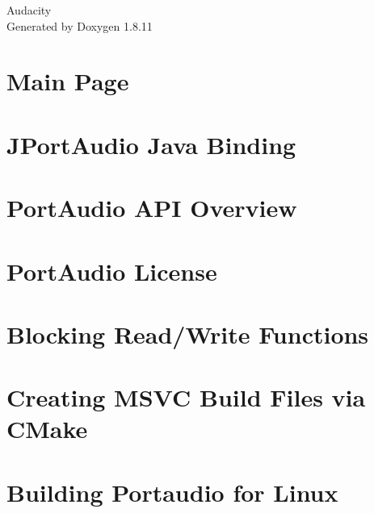 \documentclass[twoside]{book}
\newcommand{\+}{\discretionary{\mbox{\scriptsize$\hookleftarrow$}}{}{}}
\newcommand{\clearemptydoublepage}{%
  \newpage{\pagestyle{empty}\cleardoublepage}%
}
\begin{document}
\hypersetup{pageanchor=false,
             bookmarksnumbered=true,
             pdfencoding=unicode
            }
\begin{titlepage}
\vspace*{7cm}
\begin{center}%
{\Large Audacity }\\
\vspace*{1cm}
{\large Generated by Doxygen 1.8.11}\\
\end{center}
\end{titlepage}
\clearemptydoublepage
\tableofcontents
\clearemptydoublepage
{}
\hypersetup{pageanchor=true}

\chapter{Main Page}
\label{index}\hypertarget{index}{}
\chapter{J\+Port\+Audio Java Binding}
\label{java_binding}
\hypertarget{java_binding}{}

\chapter{Port\+Audio A\+PI Overview}
\label{api_overview}
\hypertarget{api_overview}{}

\chapter{Port\+Audio License}
\label{License}
\hypertarget{License}{}

\chapter{Blocking Read/\+Write Functions}
\label{blocking_read_write}
\hypertarget{blocking_read_write}{}

\chapter{Creating M\+S\+VC Build Files via C\+Make}
\label{compile_cmake}
\hypertarget{compile_cmake}{}

\chapter{Building Portaudio for Linux}
\label{compile_linux}
\hypertarget{compile_linux}{}

\end{document}
